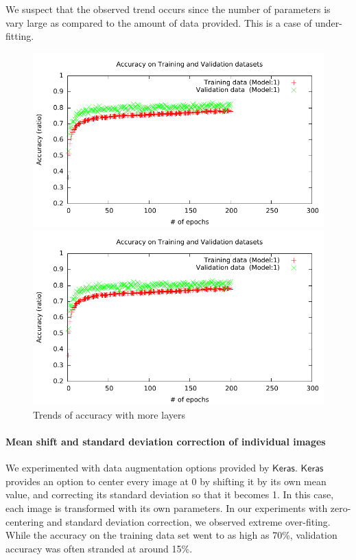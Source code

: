 \documentclass[]{article}
\newcommand*{\keras}{\ensuremath{\mathsf{Keras}}}
\begin{document}
We suspect that the observed trend occurs since the number of parameters is vary large as compared to the amount of data provided. This is a case of under-fitting. 
\begin{figure}
\centering
\begin{minipage}{0.48\textwidth}
\includegraphics[scale=0.55, page=6]{Submissionlogs/LogAcc.pdf}
\end{minipage}
\hfill
\begin{minipage}{0.48\textwidth}
\includegraphics[scale=0.55, page=7]{Submissionlogs/LogAcc.pdf}
\end{minipage}
\caption{Trends of accuracy with more layers}
\label{Fig:AccMoreLayers}
\end{figure}


\paragraph{Mean shift and standard deviation correction of individual images}
We experimented with data augmentation options provided by $\keras$. $\keras$ provides an option to center every image at 0 by shifting it by its own mean value, and correcting its standard deviation so that it becomes 1. In this case, each image is transformed with its own parameters. In our experiments with zero-centering and standard deviation correction, we observed extreme over-fiting. While the accuracy on the training data set went to as high as 70\%, validation accuracy was often stranded at around 15\%.  
\end{document}
